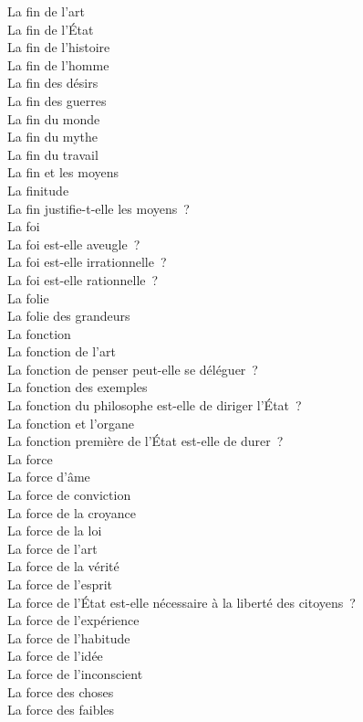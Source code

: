 \documentclass[a4paper,12pt]{article}
\begin{document}
La fin de l'art \\
La fin de l'État \\
La fin de l'histoire \\
La fin de l'homme \\
La fin des désirs \\
La fin des guerres \\
La fin du monde \\
La fin du mythe \\
La fin du travail \\
La fin et les moyens \\
La finitude \\
La fin justifie-t-elle les moyens ? \\
La foi \\
La foi est-elle aveugle ? \\
La foi est-elle irrationnelle ? \\
La foi est-elle rationnelle ? \\
La folie \\
La folie des grandeurs \\
La fonction \\
La fonction de l'art \\
La fonction de penser peut-elle se déléguer ? \\
La fonction des exemples \\
La fonction du philosophe est-elle de diriger l'État ? \\
La fonction et l'organe \\
La fonction première de l'État est-elle de durer ? \\
La force \\
La force d'âme \\
La force de conviction \\
La force de la croyance \\
La force de la loi \\
La force de l'art \\
La force de la vérité \\
La force de l'esprit \\
La force de l'État est-elle nécessaire à la liberté des citoyens ? \\
La force de l'expérience \\
La force de l'habitude \\
La force de l'idée \\
La force de l'inconscient \\
La force des choses \\
La force des faibles \\
\end{document}
